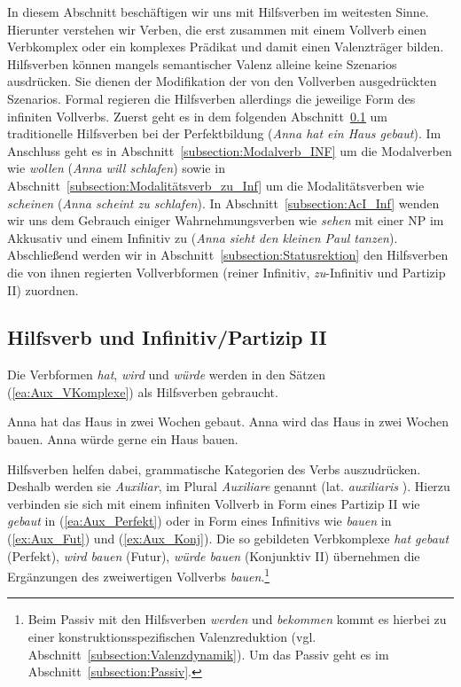 In diesem Abschnitt beschäftigen wir uns mit Hilfsverben im weitesten Sinne. Hierunter verstehen wir Verben, die erst zusammen mit einem Vollverb einen Verbkomplex oder ein komplexes Prädikat und damit einen Valenzträger bilden. Hilfsverben können mangels semantischer Valenz alleine keine Szenarios ausdrücken. Sie dienen der Modifikation der von den Vollverben ausgedrückten Szenarios. Formal regieren die Hilfsverben allerdings die jeweilige Form des infiniten Vollverbs. Zuerst geht es in dem folgenden Abschnitt~\ref{subsection:Hilfsverb_Inf_Part} um traditionelle Hilfsverben \zB bei der Perfektbildung (\textit{Anna hat ein Haus gebaut}). Im Anschluss geht es in Abschnitt~\ref{subsection:Modalverb_INF} um die Modalverben wie \textit{wollen} (\textit{Anna will schlafen}) sowie in Abschnitt~\ref{subsection:Modalitätsverb_zu_Inf} um die Modalitätsverben wie \textit{scheinen} (\textit{Anna scheint zu schlafen}). In Abschnitt~\ref{subsection:AcI_Inf} wenden wir uns dem Gebrauch einiger Wahrnehmungsverben wie \textit{sehen} mit einer NP im Akkusativ und einem Infinitiv zu (\textit{Anna sieht den kleinen Paul tanzen}). Abschließend werden wir in Abschnitt~\ref{subsection:Statusrektion} den Hilfsverben die von ihnen regierten Vollverbformen (reiner Infinitiv, \textit{zu}-Infinitiv und Partizip II) zuordnen.


\subsection{Hilfsverb und Infinitiv/Partizip II}\label{subsection:Hilfsverb_Inf_Part}

Die Verbformen \textit{hat}, \textit{wird} und \textit{würde} werden in den Sätzen (\ref{ea:Aux_VKomplexe}) als Hilfsverben gebraucht.

\ea \label{ea:Aux_VKomplexe}
\ea \label{ea:Aux_Perfekt} Anna hat das Haus in zwei Wochen gebaut.
\ex \label{ex:Aux_Fut} Anna wird das Haus in zwei Wochen bauen.
\ex \label{ex:Aux_Konj} Anna würde gerne ein Haus bauen.
\z 
\z 

Hilfsverben helfen dabei, grammatische Kategorien des Verbs auszudrücken. Deshalb werden sie \textit{Auxiliar}, im Plural \textit{Auxiliare} genannt (lat. \textit{auxiliaris} ). Hierzu verbinden sie sich mit einem infiniten Vollverb in Form eines Partizip II wie \textit{gebaut} in (\ref{ea:Aux_Perfekt}) oder in Form eines Infinitivs wie \textit{bauen} in (\ref{ex:Aux_Fut}) und (\ref{ex:Aux_Konj}). Die so gebildeten Verbkomplexe \textit{hat gebaut} (Perfekt), \textit{wird bauen} (Futur), \textit{würde bauen} (Konjunktiv II) übernehmen die Ergänzungen des zweiwertigen Vollverbs \textit{bauen}.\footnote{Beim Passiv mit den Hilfsverben \textit{werden} und \textit{bekommen} kommt es hierbei zu einer konstruktionsspezifischen Valenzreduktion (vgl. Abschnitt~\ref{subsection:Valenzdynamik}). Um das Passiv geht es im Abschnitt~\ref{subsection:Passiv}.}

